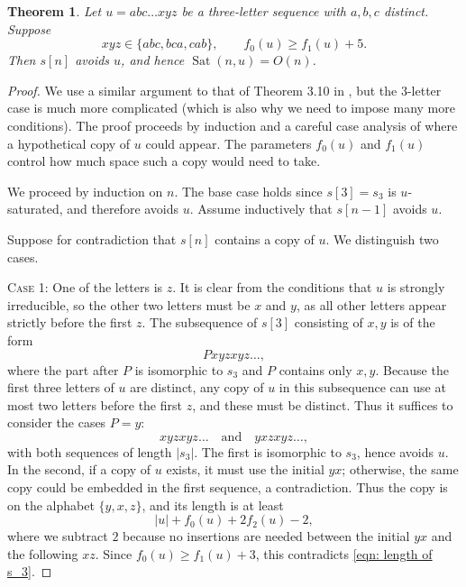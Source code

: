\documentclass[12pt]{amsart}
\DeclareMathOperator{\Sat}{Sat}
\newtheorem{thm}{Theorem}
\theoremstyle{definition}
\numberwithin{equation}{section}
\numberwithin{table}{thm}
\begin{document}
\begin{thm}\label{thm: 3-letter sequences}
    Let $u=abc\dots xyz$ be a three-letter sequence with $a,b,c$ distinct. Suppose 
    \[
    xyz \in \{abc, bca, cab\}, \qquad f_0(u)\ge f_1(u)+5.
    \]
    Then $s[n]$ avoids $u$, and hence $\Sat(n,u)=O(n)$.
\end{thm}

\begin{proof}
We use a similar argument to that of Theorem 3.10 in \cite{ANAND2025382}, but the 3-letter case is much more complicated (which is also why we need to impose many more conditions). The proof proceeds by induction and a careful case analysis of where a hypothetical copy of $u$ could appear. The parameters $f_0(u)$ and $f_1(u)$ control how much space such a copy would need to take.

We proceed by induction on $n$. The base case holds since $s[3]=s_3$ is $u$-saturated, and therefore avoids $u$. Assume inductively that $s[n-1]$ avoids $u$.

Suppose for contradiction that $s[n]$ contains a copy of $u$. We distinguish two cases.

\smallskip
\noindent
\textsc{Case 1:} One of the letters is $z$.  
It is clear from the conditions that $u$ is strongly irreducible, so the other two letters must be $x$ and $y$, as all other letters appear strictly before the first $z$. The subsequence of $s[3]$ consisting of $x,y$ is of the form
\[
Pxyzxyz\dots,
\]
where the part after $P$ is isomorphic to $s_3$ and $P$ contains only $x,y$. Because the first three letters of $u$ are distinct, any copy of $u$ in this subsequence can use at most two letters before the first $z$, and these must be distinct. Thus it suffices to consider the cases $P=y$:
\[
xyzxyz\dots \quad \text{and} \quad yxzxyz\dots,
\]
with both sequences of length $|s_3|$. The first is isomorphic to $s_3$, hence avoids $u$. In the second, if a copy of $u$ exists, it must use the initial $yx$; otherwise, the same copy could be embedded in the first sequence, a contradiction. Thus the copy is on the alphabet $\{y,x,z\}$, and its length is at least
\[
|u| + f_0(u) + 2f_2(u) - 2,
\]
where we subtract $2$ because no insertions are needed between the initial $yx$ and the following $xz$. Since $f_0(u)\ge f_1(u)+3$, this contradicts \eqref{eqn: length of s_3}.


\end{proof}
\end{document}
